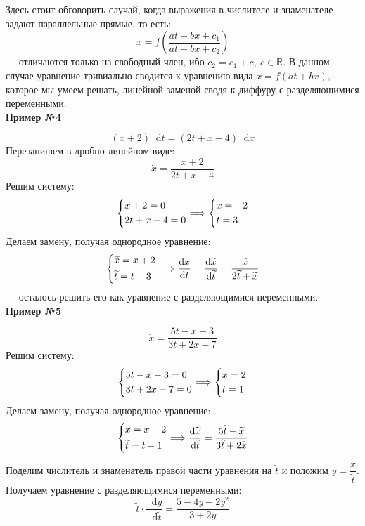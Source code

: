 \documentclass[a4paper,12pt]{article}
\newcommand{\R}{\mathbb{R}}
\renewcommand*\d{\mathop{}\!\mathrm{d}}
\newcommand{\dx}{\dot{x}}
\newcommand{\wx}{\widetilde{x}}
\newcommand{\wt}{\widetilde{t}}
\begin{document}
Здесь стоит обговорить случай, когда выражения в числителе и знаменателе задают параллельные прямые, то есть:
\[\dx = f\left(\dfrac{at + bx + c_1}{at + bx + c_2}\right)\] --- отличаются только на свободный член, ибо $c_2 = c_1 + c,\ c \in \R$. В данном случае уравнение тривиально сводится к уравнению вида $\dx = \widetilde{f}(at + bx)$, которое мы умеем решать, линейной заменой сводя к диффуру с разделяющимися переменными.
\ \\

\textbf{Пример №4}

\[(x + 2)\d t = (2t + x - 4)\d x\]
Перезапишем в дробно-линейном виде:
\[\dx = \dfrac{x + 2}{2t + x - 4}\]
Решим систему:
\[\left\{\begin{gathered}
x + 2 = 0\hfill\\
2t + x - 4 = 0\hfill
\end{gathered}\right. \Longrightarrow \left\{\begin{gathered}
	x = -2\hfill\\
	t = 3\hfill
\end{gathered}\right.\]
Делаем замену, получая однородное уравнение:
\[\left\{\begin{gathered}
\wx = x + 2\hfill\\
\wt = t - 3\hfill
\end{gathered}\right. \Longrightarrow \dfrac{\d x}{\d t} = \dfrac{\d \wx}{\d\wt} = \dfrac{\wx}{2\wt + \wx}\] --- осталось решить его как уравнение с разделяющимися переменными.
\ \\

\textbf{Пример №5}

\[\dx = \dfrac{5t - x - 3}{3t + 2x - 7}\]
Решим систему:
\[\left\{\begin{gathered}
5t - x - 3 = 0\hfill\\
3t + 2x - 7 = 0\hfill
\end{gathered}\right. \Longrightarrow \left\{\begin{gathered}
x = 2\hfill\\
t = 1\hfill
\end{gathered}\right.\]
Делаем замену, получая однородное уравнение:
\[\left\{\begin{gathered}
\wx = x - 2\hfill\\
\wt = t - 1\hfill
\end{gathered}\right. \Longrightarrow \dfrac{\d \wx}{\d\wt} = \dfrac{5\wt - \wx}{3\wt + 2\wx}\]
Поделим числитель и знаменатель правой части уравнения на $\wt$	и положим $y = \dfrac{\wx}{\wt}$. Получаем уравнение с разделяющимися переменными:
\[\wt \cdot \dfrac{\d y}{\d \wt} = \dfrac{5 - 4y - 2y^2}{3 + 2y}\]
\end{document}
